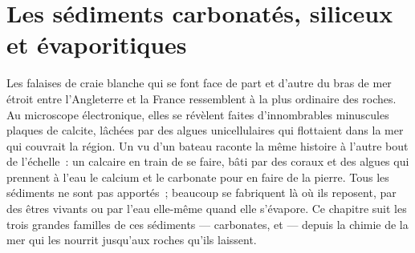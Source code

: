 \chapter{Les sédiments carbonatés, siliceux et évaporitiques}\label{ch:b1:chemical-biogenic-sediments}

Les falaises de craie blanche qui se font face de part et d'autre du bras de mer
étroit entre l'Angleterre et la France ressemblent à la plus ordinaire des
roches. Au microscope électronique, elles se révèlent faites d'innombrables
minuscules plaques de calcite, lâchées par des algues unicellulaires qui
flottaient dans la mer qui couvrait la région. Un  vu d'un bateau raconte
la même histoire à l'autre bout de l'échelle~: un calcaire en train de se faire,
bâti par des coraux et des algues qui prennent à l'eau le calcium et le
carbonate pour en faire de la pierre. Tous les sédiments ne sont pas apportés~;
beaucoup se fabriquent là où ils reposent, par des êtres vivants ou par l'eau
elle-même quand elle s'évapore. Ce chapitre suit les trois grandes familles de
ces sédiments --- carbonates,  et  --- depuis la
chimie de la mer qui les nourrit jusqu'aux roches qu'ils laissent.

